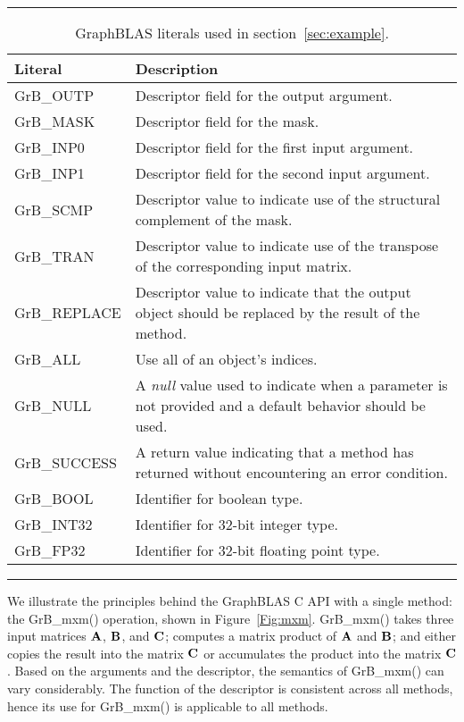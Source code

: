 \begin{table}[h]
\hrule
\begin{center}
\caption{GraphBLAS literals used in section~\ref{sec:example}.}
\label{Tab:GrBliterals}
\begin{tabular}{lp{5.9cm}}
Literal                 & Description  \\
\hline
	{\sf GrB\_OUTP}      & Descriptor field for the output argument. \\
	{\sf GrB\_MASK}      & Descriptor field for the mask. \\
	{\sf GrB\_INP0}      & Descriptor field for the first input argument. \\
	{\sf GrB\_INP1}      & Descriptor field for the second input argument. \\ 
	{\sf GrB\_SCMP}      & Descriptor value to indicate use of the structural complement of the mask. \\
	{\sf GrB\_TRAN}      & Descriptor value to indicate use of the transpose of the corresponding input matrix. \\
	{\sf GrB\_REPLACE}   & Descriptor value to indicate that the output object should be replaced by the result of the method. \\ 
	{\sf GrB\_ALL}       & Use all of an object's indices. \\
	{\sf GrB\_NULL}      & A \emph{null} value used to indicate when a parameter is not provided and a default behavior should be used. \\
	{\sf GrB\_SUCCESS}   & A return value indicating that a method has returned without encountering an error condition. \\
	{\sf GrB\_BOOL}		   & Identifier for boolean type. \\
	{\sf GrB\_INT32}	   & Identifier for 32-bit integer type. \\
	{\sf GrB\_FP32}		   & Identifier for 32-bit floating point type. \\
\end{tabular}
\end{center}
\hrule
\end{table}

We illustrate the principles behind the GraphBLAS C API with a single method: 
the {\sf GrB\_mxm()} operation, shown in Figure~\ref{Fig:mxm}.
{\sf GrB\_mxm()} takes three input matrices ${\bf A}$, ${\bf B}$, and ${\bf C}$; 
computes a matrix product of ${\bf A}$ and ${\bf B}$; and either copies the result into the matrix ${\bf C}$
or accumulates the product into the matrix ${\bf C}$.  Based on the arguments 
and the descriptor, the semantics of {\sf GrB\_mxm()} can vary considerably.
The function of the descriptor is consistent across all methods, hence its use for
{\sf GrB\_mxm()} is applicable to all methods.

